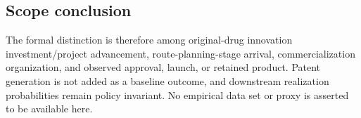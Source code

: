 \subsection{Scope conclusion}
\label{subsec:p09-scope}

The formal distinction is therefore among original-drug innovation
investment/project advancement, route-planning-stage arrival,
commercialization organization, and observed approval, launch, or retained
product. Patent generation is not added as a baseline outcome, and downstream
realization probabilities remain policy invariant. No empirical data set or
proxy is asserted to be available here.
